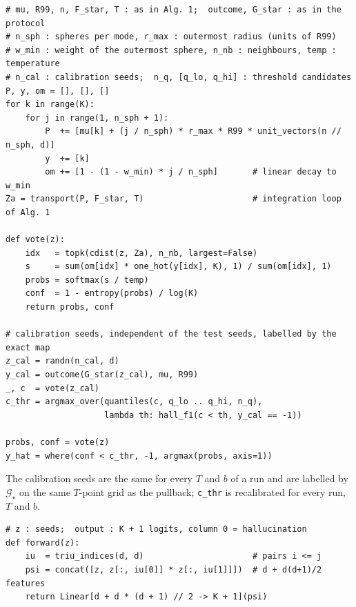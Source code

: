 \begin{algorithm}[htbp]
\caption{Weighted $k$NN (w-$k$NN) over mode-labelled anchors: seed $\to$ outcome.}
\label{alg:app-altered}
\begin{lstlisting}[style=appcode]
# mu, R99, n, F_star, T : as in Alg. 1;  outcome, G_star : as in the protocol
# n_sph : spheres per mode, r_max : outermost radius (units of R99)
# w_min : weight of the outermost sphere, n_nb : neighbours, temp : temperature
# n_cal : calibration seeds;  n_q, [q_lo, q_hi] : threshold candidates
P, y, om = [], [], []
for k in range(K):
    for j in range(1, n_sph + 1):
        P  += [mu[k] + (j / n_sph) * r_max * R99 * unit_vectors(n // n_sph, d)]
        y  += [k]
        om += [1 - (1 - w_min) * j / n_sph]       # linear decay to w_min
Za = transport(P, F_star, T)                      # integration loop of Alg. 1

def vote(z):
    idx   = topk(cdist(z, Za), n_nb, largest=False)
    s     = sum(om[idx] * one_hot(y[idx], K), 1) / sum(om[idx], 1)
    probs = softmax(s / temp)
    conf  = 1 - entropy(probs) / log(K)
    return probs, conf

# calibration seeds, independent of the test seeds, labelled by the exact map
z_cal = randn(n_cal, d)
y_cal = outcome(G_star(z_cal), mu, R99)
_, c  = vote(z_cal)
c_thr = argmax_over(quantiles(c, q_lo .. q_hi, n_q),
                    lambda th: hall_f1(c < th, y_cal == -1))

probs, conf = vote(z)
y_hat = where(conf < c_thr, -1, argmax(probs, axis=1))
\end{lstlisting}
\end{algorithm}

The calibration seeds are the same for every $T$ and $b$ of a run and are labelled by
$\mathcal{G}_\star$ on the same $T$-point grid as the pullback; \texttt{c\_thr} is recalibrated for
every run, $T$ and $b$.

\begin{algorithm}[htbp]
\caption{Quadratic classifier: logits of a seed.}
\label{alg:app-quadratic}
\begin{lstlisting}[style=appcode]
# z : seeds;  output : K + 1 logits, column 0 = hallucination
def forward(z):
    iu  = triu_indices(d, d)                      # pairs i <= j
    psi = concat([z, z[:, iu[0]] * z[:, iu[1]]])  # d + d(d+1)/2 features
    return Linear[d + d * (d + 1) // 2 -> K + 1](psi)
\end{lstlisting}
\end{algorithm}

